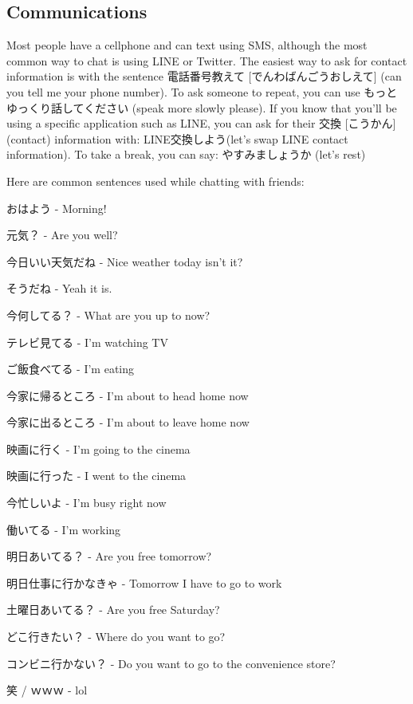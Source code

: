 \documentclass{article}
\begin{document}
\begin{CJK}{UTF8}{min}
\begin{multicols*}{3}
\subsection{Communications}

Most people have a cellphone and can text using SMS, although the most common way to chat is using LINE or Twitter. The easiest way to ask for contact information is with the 
sentence 電話番号教えて [でんわばんごうおしえて] (can you tell me your phone number). To ask someone to repeat, you can use もっとゆっくり話してください (speak more slowly please). 
If you know that you'll be using a specific application such as LINE, you can ask for their 交換 [こうかん] (contact) information with: LINE交換しよう(let's swap LINE contact 
information). To take a break, you can say: やすみましょうか (let's rest)

Here are common sentences used while chatting with friends:

\begin{colorize}
\item おはよう - Morning!
\item 元気？ - Are you well?
\item 今日いい天気だね - Nice weather today isn't it?
\item そうだね - Yeah it is.
\item 今何してる？ - What are you up to now?
\item テレビ見てる - I'm watching TV
\item ご飯食べてる - I'm eating
\item 今家に帰るところ - I'm about to head home now
\item 今家に出るところ - I'm about to leave home now
\item 映画に行く - I'm going to the cinema
\item 映画に行った - I went to the cinema
\item 今忙しいよ - I'm busy right now
\item 働いてる - I'm working
\item 明日あいてる？ - Are you free tomorrow?
\item 明日仕事に行かなきゃ - Tomorrow I have to go to work
\item 土曜日あいてる？ - Are you free Saturday?
\item どこ行きたい？ - Where do you want to go?
\item コンビニ行かない？ - Do you want to go to the convenience store?
\item 笑 / ｗｗｗ - lol
\end{colorize}


\end{multicols*}
\end{CJK}
\end{document}

